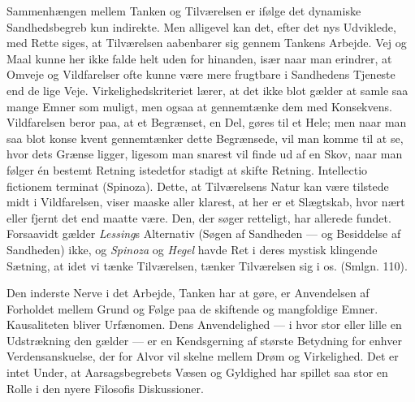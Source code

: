 \documentclass[12pt,a4paper]{book}
\newcommand{\opage}[1]{\marginnote{\footnotesize\textit{[#1]}}}
\begin{document}
Sammenhængen mellem Tanken og Tilværelsen er ifølge det dynamiske Sandhedsbegreb kun
indirekte. Men alligevel kan det, efter det nys Udviklede, med Rette siges, at
Tilværelsen aabenbarer sig gennem Tankens Arbejde. Vej og Maal kunne her ikke falde helt
uden for hinanden, især naar man erindrer, at Omveje og Vildfarelser ofte kunne være mere
frugtbare i Sandhedens Tjeneste end de lige Veje. Virkelighedskriteriet lærer, at det
ikke blot gælder at samle saa mange Emner som muligt, men ogsaa at gennemtænke dem med
Konsekvens. Vildfarelsen beror paa, at et Begrænset, en Del, gøres til et Hele; men naar
man saa blot konse%
\opage{320}kvent gennemtænker dette Begrænsede, vil man komme til at se, hvor dets
Grænse ligger, ligesom man snarest vil finde ud af en Skov, naar man følger én bestemt
Retning istedetfor stadigt at skifte Retning. Intellectio fictionem terminat (Spinoza).
Dette, at Tilværelsens Natur kan være tilstede midt i Vildfarelsen, viser maaske aller
klarest, at her er et Slægtskab, hvor nært eller fjernt det end maatte være. Den, der
søger retteligt, har allerede fundet. Forsaavidt gælder \emph{Lessing}s Alternativ (Søgen
af Sandheden --- og Besiddelse af Sandheden) ikke, og \emph{Spinoza} og \emph{Hegel}
havde Ret i deres mystisk klingende Sætning, at idet vi tænke Tilværelsen, tænker
Tilværelsen sig i os. (Smlgn. 110).

Den inderste Nerve i det Arbejde, Tanken har at gøre, er Anvendelsen af Forholdet mellem
Grund og Følge paa de skiftende og mangfoldige Emner. Kausaliteten bliver Urfænomen. Dens
Anvendelighed --- i hvor stor eller lille en Udstrækning den gælder --- er en
Kendsgerning af største Betydning for enhver Verdensanskuelse, der for Alvor vil skelne
mellem Drøm og Virkelighed. Det er intet Under, at Aarsagsbegrebets Væsen og Gyldighed
har spillet saa stor en Rolle i den nyere Filosofis Diskussioner.
\end{document}
